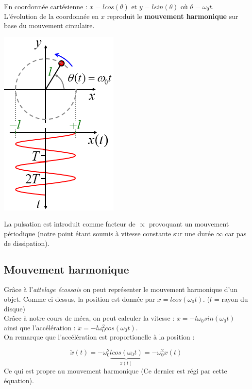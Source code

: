 \documentclass	[11pt, a4paper, openany]{book}
\begin{document}
	En coordonnée cartésienne : $x = l cos(\theta)$ et $y = l sin(\theta)$ où $\theta = \omega_0 t$. L'évolution de la coordonnée en $x$ reproduit le \textbf{mouvement harmonique} sur base du mouvement circulaire.
	
	\begin{center}
		\includegraphics[scale=0.35]{oo/image0.png}
	\end{center}
	La pulsation est introduit comme facteur de $\propto$ provoquant un mouvement périodique (notre point étant soumis à vitesse constante sur une durée $\infty$ car pas de dissipation).
	\subsection{Mouvement harmonique}
	Grâce à l'\textit{attelage écossais} on peut représenter le mouvement harmonique d'un objet. Comme ci-dessus, la position est donnée par $x = l cos(\omega_0 t)$. ($l$ = rayon du disque)\\
	Grâce à notre cours de méca, on peut calculer la vitesse : $\dot{x} = -l \omega_0 sin(\omega_0 t)$ ainsi que l'accélération : $\ddot{x} = -l \omega_0^2 cos(\omega_0 t)$. \\
	On remarque que l'accélération est proportionelle à la position : 
	
	
	
	\begin{equation}
		\ddot{x}(t) = -\omega_0^2 \underbrace{l cos(\omega_0 t)}_{x(t)} = - \omega_0^2 x(t)
	\end{equation}
	Ce qui est propre au mouvement harmonique (Ce dernier est régi par cette équation).
	
\end{document}
